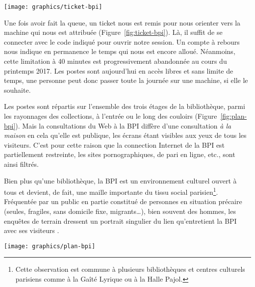\documentclass[symmetric,justified,marginals=raggedouter]{tufte-book}
\begin{document}
\begin{marginfigure}%
  \texttt{[image: graphics/ticket-bpi]}
  \vspace*{0.2cm}  
  \caption{Ticket de réservation d'une session de 40 mn sur l'un des postes Internet Libre de la BPI}
  \label{fig:ticket-bpi}
\end{marginfigure} 

Une fois avoir fait la queue, un ticket nous est remis pour nous orienter vers la machine qui nous est attribuée (Figure~\ref{fig:ticket-bpi}). Là, il suffit de se connecter avec le code indiqué pour ouvrir notre session. Un compte à rebours nous indique en permanence le temps qui nous est encore alloué. Néanmoins, cette limitation à 40 minutes est progressivement abandonnée au cours du printemps 2017. Les postes sont aujourd'hui en accès libres et sans limite de temps, une personne peut donc passer toute la journée sur une machine, si elle le souhaite. 

Les postes sont répartis sur l'ensemble des trois étages de la bibliothèque, parmi les rayonnages des collections, à l'entrée ou le long des couloirs (Figure~\ref{fig:plan-bpi}). Mais la consultations du Web à la BPI diffère d'une consultation \textit{à la maison} en cela qu'elle est publique, les écrans étant visibles aux yeux de tous les visiteurs. C'est pour cette raison que la connection Internet de la BPI est partiellement restreinte, les sites pornographiques, de pari en ligne, etc., sont ainsi filtrés.

Bien plus qu'une bibliothèque, la BPI est un environnement culturel ouvert à tous et devient, de fait, une maille importante du tissu social parisien\footnote{Cette observation est commune à plusieurs bibliothèques et centres culturels parisiens comme à la Gaîté Lyrique ou à la Halle Pajol.}. Fréquentée par un public en partie constitué de personnes en situation précaire (seules, fragiles, sans domicile fixe, migrants\ldots{}), bien souvent des hommes, les enquêtes de terrain dressent un portrait singulier du lien qu'entretient la BPI avec ses visiteurs \citep{paugam_pauvres_2013}. 

\begin{figure*}
  \texttt{[image: graphics/plan-bpi]}
  \caption{Implantation des postes Internet Libre (rouge) sur les trois étages de la BPI}
  \label{fig:plan-bpi}
\end{figure*}
\end{document}
